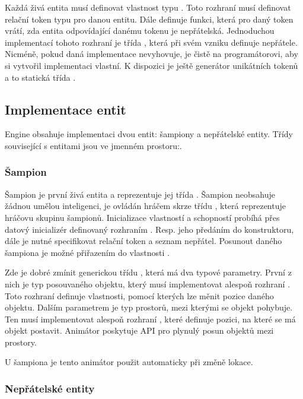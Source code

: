 Každá živá entita musí definovat vlastnost typu . Toto rozhraní musí definovat relační token typu
 pro danou entitu. Dále definuje funkci, která pro daný token vrátí, zda entita odpovídající danému 
tokenu je nepřátelská. Jednoduchou implementací tohoto rozhraní je třída , která při 
svém vzniku definuje nepřátele. Nicméně, pokud daná implementace nevyhovuje, je čistě na programátorovi,
aby si vytvořil implementaci vlastní. K dispozici je ještě generátor unikátních tokenů a to statická třída .

\subsection{Implementace entit}\label{xyz}
Engine obsahuje implementaci dvou entit: šampiony a nepřátelské entity.
Třídy související s entitami jsou ve jmenném prostoru:\newline {}.


\subsubsection{Šampion}
Šampion je první živá
entita a reprezentuje jej třída . Šampion neobsahuje žádnou umělou inteligenci, je ovládán hráčem skrze
třídu , která reprezentuje hráčovu skupinu šampionů. Inicializace vlastností a schopností probíhá přes
datový inicializér definovaný rozhraním . Resp. jeho předáním do konstruktoru, dále je nutné
specifikovat relační token a seznam nepřátel. Posunout daného šampiona je možné přiřazením do vlastnosti .

Zde je dobré zmínit generickou třídu , která má dva typové parametry. První z nich je typ posouvaného 
objektu, který musí implementovat alespoň rozhraní . Toto  rozhraní definuje vlastnosti, pomocí kterých lze měnit
pozice daného objektu. Dalším parametrem je typ prostorů, mezi kterými se objekt pohybuje. Ten musí implementovat alespoň 
rozhraní , které definuje pozici, na které se má objekt postavit. Animátor poskytuje API pro plynulý
posun objektů mezi prostory.

U šampiona je tento animátor použit automaticky při změně lokace.

\subsubsection{Nepřátelské entity}

